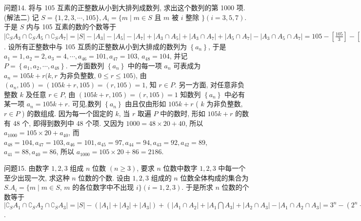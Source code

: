 问题14. 将与 105 互素的正整数从小到大排列成数列, 求出这个数列的第 1000 项.
(解法二) 记 $S=\{1,2,3, \cdots, 105\}, A_i=\{m \mid m \in S$ 且 $m$ 被 $i$ 整除 $\} (i=3,5,7)$. 于是 $S$ 内与 105 互素的数的个数等于 $\left|\complement_S A_3 \cap \complement_S A_5 \cap \complement_S A_7\right|= |S|-\left|A_3\right|-\left|A_5\right|-\left|A_7\right|+\left|A_3 \cap A_5\right|+\left|A_3 \cap A_7\right|+\left|A_5 \cap A_7\right|- \left|A_3 \cap A_5 \cap A_7\right|=105-\left[\frac{105}{3}\right]-\left[\frac{105}{5}\right]-\left[\frac{105}{7}\right]+\left[\frac{105}{3 \times 5}\right]+\left[\frac{105}{3 \times 7}\right]+ \left[\frac{105}{5 \times 7}\right]-\left[\frac{105}{3 \times 5 \times 7}\right]=48$. 设所有正整数中与 105 互质的正整数从小到大排成的数列为 $\left\{a_n\right\}$, 于是 $a_1=1, a_2=2, a_3=4, \cdots, a_{46}=101, a_{47}=103$, $a_{48}=104$, 并记 $P=\left\{a_1, a_2, \cdots, a_{48}\right\}$. 一方面数列 $\left\{a_n\right\}$ 中的每一项 $a_n$ 可表成为 $a_n=105 k+r(k, r$ 为非负整数, $0 \leqslant r \leqslant 105)$, 由 $\left(a_n, 105\right)=(105 k+ r, 105)=(r, 105)=1$, 知 $r \in P$. 另一方面, 对任意非负整数 $k$ 及任意 $r \in P$, 由 $(105 k+r, 105)=(r, 105)=1$ 知数列 $\left\{a_n\right\}$ 中必有某一项 $a_n=105 k+ r$. 可见,数列 $\left\{a_n\right\}$ 由且仅由形如 $105 k+r$ ( $k$ 为非负整数, $r \in P$ ) 的数组成.
因为每一个固定的 $k$, 当 $r$ 取遍 $P$ 中的数时, 形如 $105 k+r$ 的数有 48 个, 即得到数列中 48 个项.
又因为 $1000=48 \times 20+40$, 所以 $a_{1000}=105 \times 20+a_{40}$, 而 $a_{48}=104, a_{47}=103, a_{46}=101, a_{45}=97, a_{44}=94, a_{43}=92, a_{42}=89$, $a_{41}=88, a_{40}=86$, 所以 $a_{1000}=105 \times 20+86=2186$.



问题15. 由数字 $1,2,3$ 组成 $n$ 位数 $(n \geqslant 3)$, 要求 $n$ 位数中数字 $1,2,3$ 中每一个至少出现一次, 求这种 $n$ 位数的个数.
设由 $1,2,3$ 组成的 $n$ 位数全体构成的集合为 $S . A_i=\{m \mid m \in S$, $m$ 的各位数字中不出现 $i\}(i=1,2,3)$. 于是所求 $n$ 位数的个数等于 $\left|\complement_S A_1 \cap \complement_S A_2 \cap \complement_S A_3\right|=|S|-\left(\left|A_1\right|+\left|A_2\right|+\left|A_3\right|\right)+\left(\left|A_1 \cap A_2\right|+\right. \left|A_1 \bigcap A_3\right|+\left|A_2 \cap A_3\right|-\left|A_1 \cap A_2 \cap A_3\right|=3^n-\left(2^n+2^n+2^n\right)+\left(1^n+\right. \left.1^n+1^n\right)-0=3^n-3 \cdot 2^n+3$.


